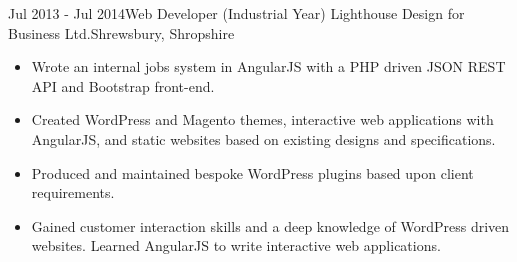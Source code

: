 \documentclass[11pt,a4paper]{moderncv}
\begin{document}
		\cventry
			{Jul 2013 - Jul 2014}{Web Developer (Industrial Year)}
			{Lighthouse Design for Business Ltd.}{Shrewsbury, Shropshire}
			{}{\begin{itemize}
				\item Wrote an internal jobs system in AngularJS with a PHP driven JSON REST API and Bootstrap front-end.
				\item Created WordPress and Magento themes, interactive web applications with AngularJS, and static websites based on existing designs and specifications.
				\item Produced and maintained bespoke WordPress plugins based upon client requirements.
				\item Gained customer interaction skills and a deep knowledge of WordPress driven websites. Learned AngularJS to write interactive web applications.
			\end{itemize}}
\end{document}

